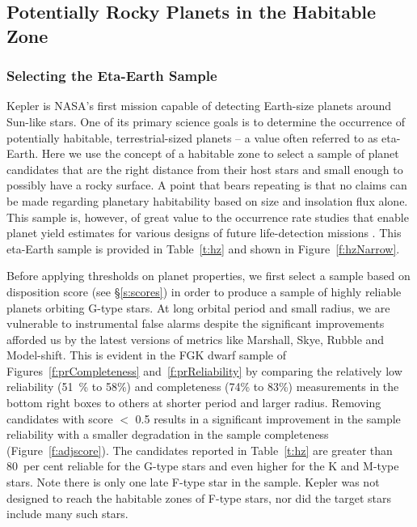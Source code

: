 \label{s:hz}
\subsection{Potentially Rocky Planets in the Habitable Zone}

\subsubsection{Selecting the Eta-Earth Sample}
Kepler is NASA's first mission capable of detecting Earth-size planets around Sun-like stars.  One of its primary science goals is to determine the occurrence of potentially habitable, terrestrial-sized planets -- a value often referred to as eta-Earth.  Here we use the concept of a habitable zone to select a sample of planet candidates that are the right distance from their host stars and small enough to possibly have a rocky surface. A point that bears repeating is that no claims can be made regarding planetary habitability based on size and insolation flux alone.   This sample is, however, of great value to the occurrence rate studies that enable planet yield estimates for various designs of future life-detection missions \citep{stark2015}. This eta-Earth sample is provided in Table~\ref{t:hz} and shown in Figure~\ref{f:hzNarrow}.


Before applying thresholds on planet properties, we first select a sample based on disposition score (see \S\ref{s:scores}) in order to produce a sample of highly reliable planets orbiting G-type stars. At long orbital period and small radius, we are vulnerable to instrumental false alarms despite the significant improvements afforded us by the latest versions of metrics like Marshall, Skye, Rubble and Model-shift. This is evident in the FGK dwarf sample of Figures~\ref{f:prCompleteness} and~\ref{f:prReliability} by comparing the relatively low reliability (51~\% to 58\%) and completeness (74\% to 83\%) measurements in the bottom right boxes to others at shorter period and larger radius.  Removing candidates with score $<$ 0.5 results in a significant improvement in the sample reliability with a smaller degradation in the sample completeness (Figure~\ref{f:adjscore}).  The candidates reported in Table~\ref{t:hz} are greater than 80~per cent reliable for the G-type stars and even higher for the K and M-type stars. Note there is only one late F-type star in the sample.  Kepler was not designed to reach the habitable zones of F-type stars, nor did the target stars include many such stars.


